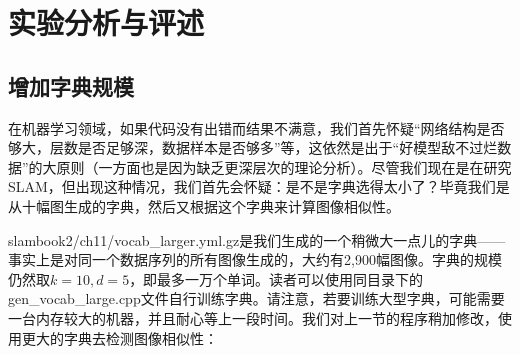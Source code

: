\section{实验分析与评述}
\subsection{增加字典规模}
在机器学习领域，如果代码没有出错而结果不满意，我们首先怀疑“网络结构是否够大，层数是否足够深，数据样本是否够多”等，这依然是出于“好模型敌不过烂数据”的大原则（一方面也是因为缺乏更深层次的理论分析）。尽管我们现在是在研究SLAM，但出现这种情况，我们首先会怀疑：是不是字典选得太小了？毕竟我们是从十幅图生成的字典，然后又根据这个字典来计算图像相似性。

slambook2/ch11/vocab\_larger.yml.gz是我们生成的一个稍微大一点儿的字典——事实上是对同一个数据序列的所有图像生成的，大约有2,900幅图像。字典的规模仍然取$k=10,d=5$，即最多一万个单词。读者可以使用同目录下的gen\_vocab\_large.cpp文件自行训练字典。请注意，若要训练大型字典，可能需要一台内存较大的机器，并且耐心等上一段时间。我们对上一节的程序稍加修改，使用更大的字典去检测图像相似性：

